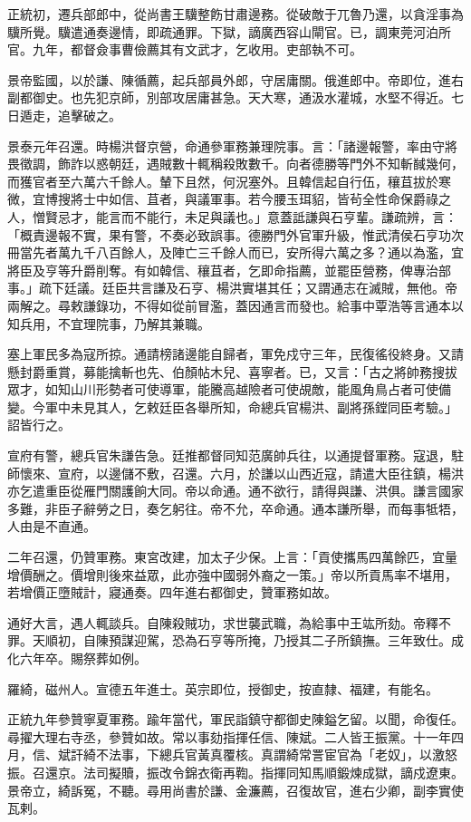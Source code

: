 \begin{pinyinscope}
正統初，遷兵部郎中，從尚書王驥整飭甘肅邊務。從破敵于兀魯乃還，以貪淫事為驥所覺。驥遣通奏邊情，即疏通罪。下獄，謫廣西容山閘官。已，調東莞河泊所官。九年，都督僉事曹儉薦其有文武才，乞收用。吏部執不可。

景帝監國，以於謙、陳循薦，起兵部員外郎，守居庸關。俄進郎中。帝即位，進右副都御史。也先犯京師，別部攻居庸甚急。天大寒，通汲水灌城，水堅不得近。七日遁走，追擊破之。

景泰元年召還。時楊洪督京營，命通參軍務兼理院事。言：「諸邊報警，率由守將畏徵調，飾詐以惑朝廷，遇賊數十輒稱殺敗數千。向者德勝等門外不知斬馘幾何，而獲官者至六萬六千餘人。輦下且然，何況塞外。且韓信起自行伍，穰苴拔於寒微，宜博搜將士中如信、苴者，與議軍事。若今腰玉珥貂，皆茍全性命保爵祿之人，憎賢忌才，能言而不能行，未足與議也。」意蓋詆謙與石亨輩。謙疏辨，言：「概責邊報不實，果有警，不奏必致誤事。德勝門外官軍升級，惟武清侯石亨功次冊當先者萬九千八百餘人，及陣亡三千餘人而已，安所得六萬之多？通以為濫，宜將臣及亨等升爵削奪。有如韓信、穰苴者，乞即命指薦，並罷臣營務，俾專治部事。」疏下廷議。廷臣共言謙及石亨、楊洪實堪其任；又謂通志在滅賊，無他。帝兩解之。尋敕謙錄功，不得如從前冒濫，蓋因通言而發也。給事中覃浩等言通本以知兵用，不宜理院事，乃解其兼職。

塞上軍民多為寇所掠。通請榜諸邊能自歸者，軍免戍守三年，民復徭役終身。又請懸封爵重賞，募能擒斬也先、伯顏帖木兒、喜寧者。已，又言：「古之將帥務搜拔眾才，如知山川形勢者可使導軍，能騰高越險者可使覘敵，能風角鳥占者可使備變。今軍中未見其人，乞敕廷臣各舉所知，命總兵官楊洪、副將孫鏜同臣考驗。」詔皆行之。

宣府有警，總兵官朱謙告急。廷推都督同知范廣帥兵往，以通提督軍務。寇退，駐師懷來、宣府，以邊儲不敷，召還。六月，於謙以山西近寇，請遣大臣往鎮，楊洪亦乞遣重臣從雁門關護餉大同。帝以命通。通不欲行，請得與謙、洪俱。謙言國家多難，非臣子辭勞之日，奏乞躬往。帝不允，卒命通。通本謙所舉，而每事牴牾，人由是不直通。

二年召還，仍贊軍務。東宮改建，加太子少保。上言：「貢使攜馬四萬餘匹，宜量增價酬之。價增則後來益眾，此亦強中國弱外裔之一策。」帝以所貢馬率不堪用，若增價正墮賊計，寢通奏。四年進右都御史，贊軍務如故。

通好大言，遇人輒談兵。自陳殺賊功，求世襲武職，為給事中王竑所劾。帝釋不罪。天順初，自陳預謀迎駕，恐為石亨等所掩，乃授其二子所鎮撫。三年致仕。成化六年卒。賜祭葬如例。

羅綺，磁州人。宣德五年進士。英宗即位，授御史，按直隸、福建，有能名。

正統九年參贊寧夏軍務。踰年當代，軍民詣鎮守都御史陳鎰乞留。以聞，命復任。尋擢大理右寺丞，參贊如故。常以事劾指揮任信、陳斌。二人皆王振黨。十一年四月，信、斌訐綺不法事，下總兵官黃真覆核。真謂綺常詈宦官為「老奴」，以激怒振。召還京。法司擬贖，振改令錦衣衛再鞫。指揮同知馬順鍛煉成獄，謫戍遼東。景帝立，綺訴冤，不聽。尋用尚書於謙、金濂薦，召復故官，進右少卿，副李實使瓦剌。


\end{pinyinscope}
